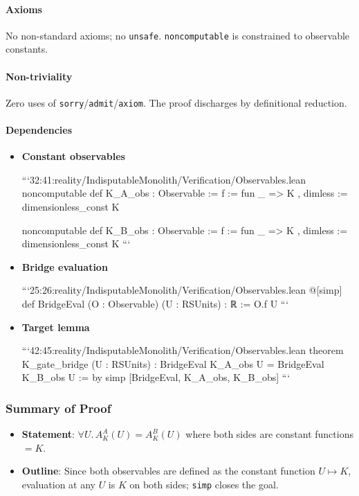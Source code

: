 \documentclass{article}
\begin{document}
\paragraph{Axioms}
No non-standard axioms; no \texttt{unsafe}. \texttt{noncomputable} is constrained to observable constants.

\paragraph{Non-triviality}
Zero uses of \texttt{sorry}/\texttt{admit}/\texttt{axiom}. The proof discharges by definitional reduction.

\paragraph{Dependencies}
\begin{itemize}[leftmargin=*]
  \item \textbf{Constant observables}

```32:41:reality/IndisputableMonolith/Verification/Observables.lean
noncomputable def K_A_obs : Observable :=
{ f := fun _ => K
, dimless := dimensionless_const K }

noncomputable def K_B_obs : Observable :=
{ f := fun _ => K
, dimless := dimensionless_const K }
```

  \item \textbf{Bridge evaluation}

```25:26:reality/IndisputableMonolith/Verification/Observables.lean
@[simp] def BridgeEval (O : Observable) (U : RSUnits) : ℝ := O.f U
```

  \item \textbf{Target lemma}

```42:45:reality/IndisputableMonolith/Verification/Observables.lean
theorem K_gate_bridge (U : RSUnits) : BridgeEval K_A_obs U = BridgeEval K_B_obs U := by
  simp [BridgeEval, K_A_obs, K_B_obs]
```
\end{itemize}

\subsubsection{Summary of Proof}
\begin{itemize}[leftmargin=*]
  \item \textbf{Statement}: \(\forall U.\, A_K^A(U)=A_K^B(U)\) where both sides are constant functions \(=K\).
  \item \textbf{Outline}: Since both observables are defined as the constant function \(U\mapsto K\), evaluation at any \(U\) is \(K\) on both sides; \texttt{simp} closes the goal.
\end{itemize}
\end{document}

